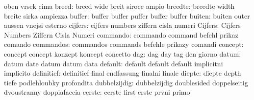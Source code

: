                            oben                      vrsek
                           cima
                    breed: breed                     wide
                           breit                     siroce
                           ampio
                  breedte: breedte                   width
                           breite                    sirka
                           ampiezza
                   buffer: buffer                    buffer
                           puffer                    buffer
                           buffer
                   buiten: buiten                    outer
                           aussen                    vnejsi
                           esterno
                  cijfers: cijfers                   numbers
                           ziffern                   cisla
                           numeri
                  Cijfers: Cijfers                   Numbers
                           Ziffern                   Cisla
                           Numeri
                 commando: commando                  command
                           befehl                    prikaz
                           comando
                commandos: commandos                 commands
                           befehle                   prikazy
                           comandi
                  concept: concept                   concept
                           konzept                   koncept
                           concetto
                      dag: dag                       day
                           tag                       den
                           giorno
                    datum: datum                     date
                           datum                     datum
                           data
                  default: default                   default
                           default                   implicitni
                           implicito
               definitief: definitief                final
                           endfassung                finalni
                           finale
                   diepte: diepte                    depth
                           tiefe                     podlehloubky
                           profondita                %
             dubbelzijdig: dubbelzijdig              doublesided
                           doppelseitig              dvoustranny
                           doppiafaccia
                   eerste: eerste                    first
                           erste                     prvni
                           primo
